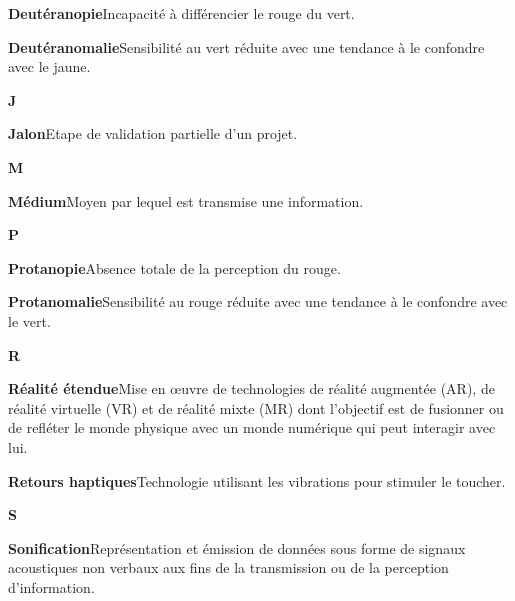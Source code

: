 \documentclass[a4paper,12pt]{article}
\begin{document}
\begin{multicols}{2}
\textbf{\hypertarget{gls-14}{Deutéranopie}}\hspace*{1em}Incapacité à différencier le rouge du vert.\hspace*{.5em}\pageref{gls-13-use-1}

\textbf{\hypertarget{gls-13}{Deutéranomalie}}\hspace*{1em}Sensibilité au vert réduite avec une tendance à le confondre avec le jaune.\hspace*{.5em}\pageref{gls-15-use-1}

\textbf{J}

\textbf{\hypertarget{gls-25}{Jalon}}\hspace*{1em}Etape de validation partielle d'un projet.\hspace*{.5em}\pageref{gls-20-use-1}

\textbf{M}

\textbf{\hypertarget{gls-27}{Médium}}\hspace*{1em}Moyen par lequel est transmise une information.\hspace*{.5em}\pageref{gls-12-use-1}

\textbf{P}

\textbf{\hypertarget{gls-32}{Protanopie}}\hspace*{1em}Absence totale de la perception du rouge.\hspace*{.5em}\pageref{gls-14-use-1}

\textbf{\hypertarget{gls-31}{Protanomalie}}\hspace*{1em}Sensibilité au rouge réduite avec une tendance à le confondre avec le vert.\hspace*{.5em}\pageref{gls-16-use-1}

\textbf{R}

\textbf{\hypertarget{gls-33}{Réalité étendue}}\hspace*{1em}Mise en œuvre de technologies de réalité augmentée (AR), de réalité virtuelle (VR) et de réalité mixte (MR) dont l'objectif est de fusionner ou de refléter le monde physique avec un monde numérique qui peut interagir avec lui.\hspace*{.5em}\pageref{gls-9-use-1}

\textbf{\hypertarget{gls-34}{Retours haptiques}}\hspace*{1em}Technologie utilisant les vibrations pour stimuler le toucher.\hspace*{.5em}\pageref{gls-10-use-1}

\textbf{S}

\textbf{\hypertarget{gls-37}{Sonification}}\hspace*{1em}Représentation et émission de données sous forme de signaux acoustiques non verbaux aux fins de la transmission ou de la perception d’information.\hspace*{.5em}\pageref{gls-8-use-1}


\end{multicols}
\end{document}

